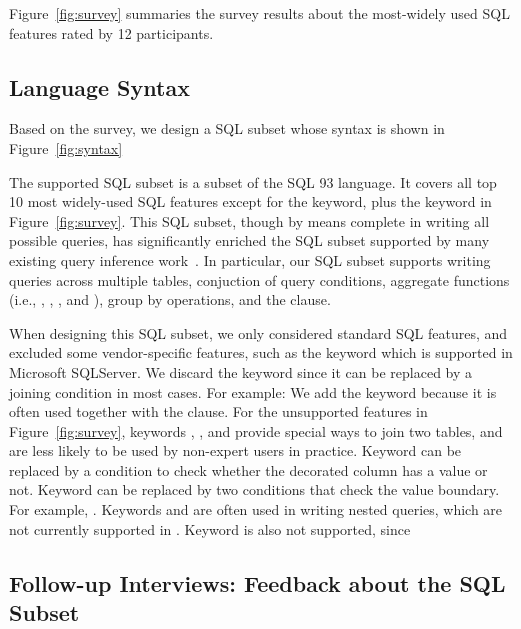 Figure~\ref{fig:survey} summaries the survey results about
the most-widely used SQL features rated by 12 participants.

\subsection{Language Syntax}
\label{sec:syntax}

Based on the survey, we design a SQL subset
whose syntax is shown in Figure~\ref{fig:syntax}


The supported SQL subset is a subset of the SQL 93
language. It covers all top 10 most widely-used SQL
features except for the  keyword, plus
the  keyword in Figure~\ref{fig:survey}. 
This SQL subset, though by means complete in writing all
possible queries, has significantly
enriched the SQL subset supported by many existing query inference
work~\cite{DasSarma:2010}. In particular, our SQL subset
supports writing queries across multiple tables,
conjuction of query conditions, aggregate functions
(i.e., , , , and ),
group by operations, and the  clause.



When designing this SQL subset, we only considered standard
SQL features, and excluded
some vendor-specific features, such as the  keyword
which is supported in Microsoft SQLServer. 
We discard the  keyword since it can be replaced
by a joining condition in most cases. For example:
\todo{}
We add the  keyword because it is often used
together with the  clause.
For the unsupported features in Figure~\ref{fig:survey},
keywords , , and 
provide special ways to join two tables, and are less
likely to be used by non-expert users in practice.
Keyword  can be replaced
by a condition to check whether the decorated
column has a  value or not.
Keyword  can be replaced by two
conditions that check the value boundary. For example,
. Keywords  and 
are often used in writing nested queries, which are
not currently supported in \ourtool.
Keyword  is also not supported, since




\subsection{Follow-up Interviews: Feedback about the SQL Subset}
\label{sec:interview}

